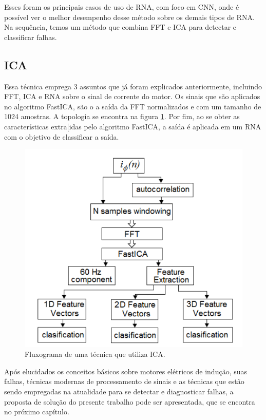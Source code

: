 Esses foram os principais casos de uso de RNA, com foco em CNN, onde é possível ver o melhor desempenho desse método sobre os demais
tipos de RNA. Na sequência, temos um método que combina FFT e ICA para detectar e classificar falhas.

% 

\subsection{ICA}

Essa técnica emprega 3 assuntos que já foram explicados anteriormente, incluindo FFT, ICA e RNA sobre o sinal de corrente
do motor. Os sinais que são aplicados no algoritmo FastICA, são o a saída da FFT normalizados e com um tamanho de 1024 amostras. 
A topologia se encontra na figura \ref{fig:ica_bracamonte_p4}. Por fim, ao se obter as características extra[idas pelo algoritmo FastICA,
a saída é aplicada em um RNA com o objetivo de classificar a saída.

\begin{figure}[H]
    \caption{Fluxograma de uma técnica que utiliza ICA.}
    \begin{center}
        \includegraphics[scale=.5]{referencial/img/ica_bracamonte_p4.png}
    \end{center}
    \label{fig:ica_bracamonte_p4}
\end{figure}

Após elucidados os conceitos básicos sobre motores elétricos de indução, suas falhas, técnicas modernas de processamento de sinais e as 
técnicas que estão sendo empregadas na atualidade para se detectar e diagnosticar falhas, a proposta de solução do presente trabalho 
pode ser apresentada, que se encontra no próximo capítulo.